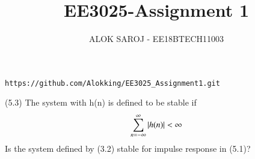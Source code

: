 \documentclass[journal,12pt,twocolumn]{IEEEtran}
\begin{document}
\def\rightbox#1{\makebox[0in][r]{#1}}
\def\centbox#1{\makebox[0in]{#1}}
\def\topbox#1{\raisebox{-\baselineskip}[0in][0in]{#1}}
\def\midbox#1{\raisebox{-0.5\baselineskip}[0in][0in]{#1}}
\vspace{3cm}
\title{EE3025-Assignment 1}
\author{ALOK SAROJ - EE18BTECH11003}
\maketitle
\newpage
\bigskip
\renewcommand{\thefigure}{\theenumi}
\renewcommand{\thetable}{\theenumi}
\begin{lstlisting}
https://github.com/Alokking/EE3025_Assignment1.git
\end{lstlisting}
(5.3) The system with h(n) is defined to be stable if 
\begin{align}
\sum_{n=-\infty}^{\infty} \left\vert h(n)\right\vert < \infty
\end{align} 
Is the system defined by (3.2) stable for impulse response in (5.1)?
\end{document}
